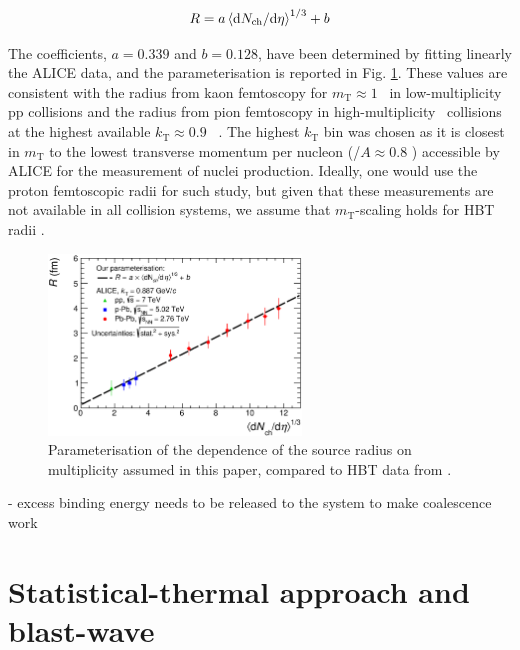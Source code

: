 \documentclass[a4paper,11pt]{scrartcl} %
\begin{document}
\begin{equation}
R = a \left<\mathrm{d}N_\mathrm{ch}/\mathrm{d}\eta\right>^{1/3} + b
\label{eq:radiusParameterisation}
\end{equation}

The coefficients, $a = 0.339$ and $b = 0.128$, have been determined by fitting linearly the ALICE data, and the parameterisation is reported in Fig. \ref{fig:radiiparam}. 
These values are consistent with the radius from kaon femtoscopy for $m_{\mathrm{T}} \approx 1$ \GeVc~in low-multiplicity pp collisions \cite{Abelev:2012sq} and the radius from pion femtoscopy in high-multiplicity \PbPb~collisions at the highest available $k_{\mathrm{T}} \approx 0.9$ \GeVc~\cite{Adam:2015vna}. 
The highest $k_{\mathrm{T}}$ bin was chosen as it is closest in $m_{\mathrm{T}}$ to the lowest transverse momentum per nucleon (\pt/$A \approx 0.8$ \GeVc) accessible by ALICE for the measurement of nuclei production. 
Ideally, one would use the proton femtoscopic radii for such study, but given that these measurements are not  available in all collision systems, we assume that $m_{\mathrm{T}}$-scaling holds for HBT radii \cite{Adam:2015vja}.

\begin{figure}[htbp]
\begin{center}
\includegraphics[width=0.6\textwidth]{HbtRadiusParam.eps}
\caption{Parameterisation of the dependence of the source radius on multiplicity assumed in this paper, compared to HBT data from \cite{Adam:2015vna, Abelev:2012sq}.}
\label{fig:radiiparam}
\end{center}
\end{figure}


- excess binding energy needs to be released to the system to make coalescence work


\section{Statistical-thermal approach and blast-wave}\label{sec:thermal}
\end{document}
